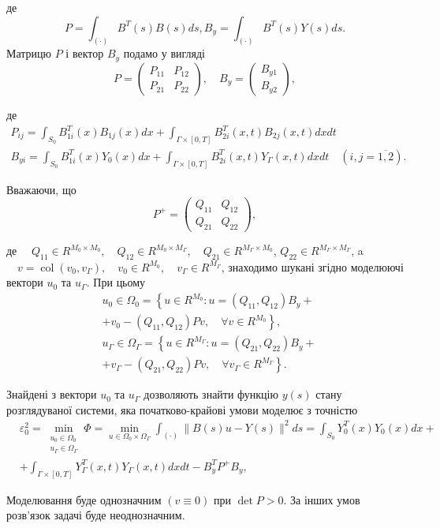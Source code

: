 де
$$
P=\int_{(\cdot)} B^T(s) B(s) d s, B_y=\int_{(\cdot)} B^T(s) Y(s) d s .
$$
Матрицю $P$ і вектор $B_y$ подамо у вигляді
$$
P=\left(\begin{array}{ll}
P_{11} & P_{12} \\
P_{21} & P_{22}
\end{array}\right), \quad B_y=\left(\begin{array}{c}
B_{y 1} \\
B_{y 2}
\end{array}\right),
$$

де
$$
\begin{gathered}
P_{i j}=\int_{S_0} B_{1 i}^T(x) B_{1 j}(x) d x+\int_{\Gamma \times[0, T]} B_{2 i}^T(x, t) B_{2 j}(x, t) d x d t \\
B_{y i}=\int_{S_0} B_{1 i}^T(x) Y_0(x) d x+\int_{\Gamma \times[0, T]} B_{2 i}^T(x, t) Y_{\Gamma}(x, t) d x d t \quad(i, j=\overline{1,2}) .
\end{gathered}
$$

Вважаючи, що
$$
P^{+}=\left(\begin{array}{ll}
Q_{11} & Q_{12} \\
Q_{21} & Q_{22}
\end{array}\right),
$$

де $\quad Q_{11} \in R^{M_0 \times M_0}, \quad Q_{12} \in R^{M_0 \times M_{\Gamma}}, \quad Q_{21} \in R^{M_{\Gamma} \times M_0}$, $Q_{22} \in R^{M_{\Gamma} \times M_{\Gamma}}$, a $\quad v=\operatorname{col}\left(v_0, v_{\Gamma}\right), \quad v_0 \in R^{M_0}, \quad v_{\Gamma} \in R^{M_{\Gamma}}$, знаходимо шукані згідно моделюючі вектори $u_0$ та $u_{\Gamma}$. При цьому
$$
\begin{aligned}
& u_0 \in \Omega_0=\left\{u \in R^{M_0}: u=\left(Q_{11}, Q_{12}\right) B_y+\right. \\
& \left.+v_0-\left(Q_{11}, Q_{12}\right) P v, \quad \forall v \in R^{M_0}\right\}, \\
& u_{\Gamma} \in \Omega_{\Gamma}=\left\{u \in R^{M_{\Gamma}}: u=\left(Q_{21}, Q_{22}\right) B_y+\right. \\
& \left.+v_{\Gamma}-\left(Q_{21}, Q_{22}\right) P v, \quad \forall v_{\Gamma} \in R^{M_{\Gamma}}\right\} .
\end{aligned}
$$

Знайдені $з$ вектори $u_0$ та $u_{\Gamma}$ дозволяють знайти функцію $y(s)$ стану розглядуваної системи, яка початково-крайові умови моделює з точністю
$$
\begin{aligned}
& \varepsilon_0^2=\min _{\substack{u_0 \in \Omega_0 \\
u_{\Gamma} \in \Omega_{\Gamma}}} \Phi=\min _{u \in \Omega_0 \times \Omega_{\Gamma}} \int_{(\cdot)}\|B(s) u-Y(s)\|^2 d s=\int_{S_0} Y_0^T(x) Y_0(x) d x+ \\
& +\int_{\Gamma \times[0, T]} Y_{\Gamma}^T(x, t) Y_{\Gamma}(x, t) d x d t-B_y^T P^{+} B_y,
\end{aligned}
$$

Моделювання буде однозначним $(v \equiv 0)$ при $\operatorname{det} P>0$. За інших умов розв'язок задачі буде неоднозначним.
